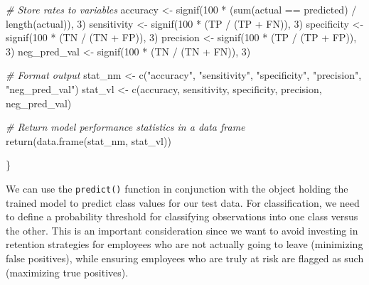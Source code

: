 \documentclass[
]{book}
\newenvironment{Shaded}{\begin{snugshade}}{\end{snugshade}}
\newcommand{\CommentTok}[1]{\textcolor[rgb]{0.56,0.35,0.01}{\textit{#1}}}
\newcommand{\DecValTok}[1]{\textcolor[rgb]{0.00,0.00,0.81}{#1}}
\newcommand{\FunctionTok}[1]{\textcolor[rgb]{0.00,0.00,0.00}{#1}}
\newcommand{\NormalTok}[1]{#1}
\newcommand{\OtherTok}[1]{\textcolor[rgb]{0.56,0.35,0.01}{#1}}
\newcommand{\SpecialCharTok}[1]{\textcolor[rgb]{0.00,0.00,0.00}{#1}}
\newcommand{\StringTok}[1]{\textcolor[rgb]{0.31,0.60,0.02}{#1}}
\begin{document}
\begin{Shaded}
\begin{Highlighting}[]
  \CommentTok{\# Store rates to variables}
\NormalTok{  accuracy }\OtherTok{\textless{}{-}} \FunctionTok{signif}\NormalTok{(}\DecValTok{100} \SpecialCharTok{*}\NormalTok{ (}\FunctionTok{sum}\NormalTok{(actual }\SpecialCharTok{==}\NormalTok{ predicted) }\SpecialCharTok{/} \FunctionTok{length}\NormalTok{(actual)), }\DecValTok{3}\NormalTok{)}
\NormalTok{  sensitivity }\OtherTok{\textless{}{-}} \FunctionTok{signif}\NormalTok{(}\DecValTok{100} \SpecialCharTok{*}\NormalTok{ (TP }\SpecialCharTok{/}\NormalTok{ (TP }\SpecialCharTok{+}\NormalTok{ FN)), }\DecValTok{3}\NormalTok{)}
\NormalTok{  specificity }\OtherTok{\textless{}{-}} \FunctionTok{signif}\NormalTok{(}\DecValTok{100} \SpecialCharTok{*}\NormalTok{ (TN }\SpecialCharTok{/}\NormalTok{ (TN }\SpecialCharTok{+}\NormalTok{ FP)), }\DecValTok{3}\NormalTok{)}
\NormalTok{  precision }\OtherTok{\textless{}{-}} \FunctionTok{signif}\NormalTok{(}\DecValTok{100} \SpecialCharTok{*}\NormalTok{ (TP }\SpecialCharTok{/}\NormalTok{ (TP }\SpecialCharTok{+}\NormalTok{ FP)), }\DecValTok{3}\NormalTok{)}
\NormalTok{  neg\_pred\_val }\OtherTok{\textless{}{-}} \FunctionTok{signif}\NormalTok{(}\DecValTok{100} \SpecialCharTok{*}\NormalTok{ (TN }\SpecialCharTok{/}\NormalTok{ (TN }\SpecialCharTok{+}\NormalTok{ FN)), }\DecValTok{3}\NormalTok{)}
  
  \CommentTok{\# Format output}
\NormalTok{  stat\_nm }\OtherTok{\textless{}{-}} \FunctionTok{c}\NormalTok{(}\StringTok{"accuracy"}\NormalTok{, }\StringTok{"sensitivity"}\NormalTok{, }\StringTok{"specificity"}\NormalTok{, }\StringTok{"precision"}\NormalTok{, }\StringTok{"neg\_pred\_val"}\NormalTok{)}
\NormalTok{  stat\_vl }\OtherTok{\textless{}{-}} \FunctionTok{c}\NormalTok{(accuracy, sensitivity, specificity, precision, neg\_pred\_val)}
  
  \CommentTok{\# Return model performance statistics in a data frame}
  \FunctionTok{return}\NormalTok{(}\FunctionTok{data.frame}\NormalTok{(stat\_nm, stat\_vl))}
  
\NormalTok{\}}
\end{Highlighting}
\end{Shaded}

We can use the \texttt{predict()} function in conjunction with the object holding the trained model to predict class values for our test data. For classification, we need to define a probability threshold for classifying observations into one class versus the other. This is an important consideration since we want to avoid investing in retention strategies for employees who are not actually going to leave (minimizing false positives), while ensuring employees who are truly at risk are flagged as such (maximizing true positives).
\end{document}
